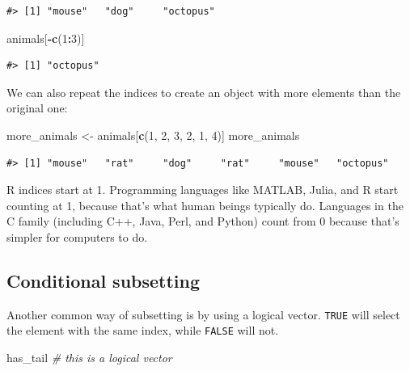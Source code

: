\documentclass[
]{book}
\newenvironment{Shaded}{\begin{snugshade}}{\end{snugshade}}
\newcommand{\CommentTok}[1]{\textcolor[rgb]{0.56,0.35,0.01}{\textit{#1}}}
\newcommand{\DecValTok}[1]{\textcolor[rgb]{0.00,0.00,0.81}{#1}}
\newcommand{\FunctionTok}[1]{\textcolor[rgb]{0.13,0.29,0.53}{\textbf{#1}}}
\newcommand{\NormalTok}[1]{#1}
\newcommand{\OtherTok}[1]{\textcolor[rgb]{0.56,0.35,0.01}{#1}}
\newcommand{\SpecialCharTok}[1]{\textcolor[rgb]{0.81,0.36,0.00}{\textbf{#1}}}
\begin{document}
\begin{verbatim}
#> [1] "mouse"   "dog"     "octopus"
\end{verbatim}

\begin{Shaded}
\begin{Highlighting}[]
\NormalTok{animals[}\SpecialCharTok{{-}}\FunctionTok{c}\NormalTok{(}\DecValTok{1}\SpecialCharTok{:}\DecValTok{3}\NormalTok{)]}
\end{Highlighting}
\end{Shaded}

\begin{verbatim}
#> [1] "octopus"
\end{verbatim}

We can also repeat the indices to create an object with more elements than the
original one:

\begin{Shaded}
\begin{Highlighting}[]
\NormalTok{more\_animals }\OtherTok{\textless{}{-}}\NormalTok{ animals[}\FunctionTok{c}\NormalTok{(}\DecValTok{1}\NormalTok{, }\DecValTok{2}\NormalTok{, }\DecValTok{3}\NormalTok{, }\DecValTok{2}\NormalTok{, }\DecValTok{1}\NormalTok{, }\DecValTok{4}\NormalTok{)]}
\NormalTok{more\_animals}
\end{Highlighting}
\end{Shaded}

\begin{verbatim}
#> [1] "mouse"   "rat"     "dog"     "rat"     "mouse"   "octopus"
\end{verbatim}

R indices start at 1. Programming languages like MATLAB, Julia, and R start
counting at 1, because that's what human beings typically do. Languages in the C
family (including C++, Java, Perl, and Python) count from 0 because that's
simpler for computers to do.

\hypertarget{conditional-subsetting}{%
\subsection{Conditional subsetting}\label{conditional-subsetting}}

Another common way of subsetting is by using a logical vector. \texttt{TRUE} will
select the element with the same index, while \texttt{FALSE} will not.

\begin{Shaded}
\begin{Highlighting}[]
\NormalTok{has\_tail }\CommentTok{\# this is a logical vector}
\end{Highlighting}
\end{Shaded}
\end{document}
